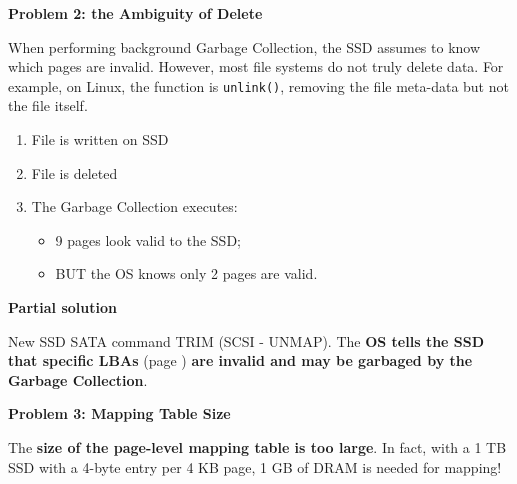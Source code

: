 \highspace
\begin{flushleft}
    \textcolor{Red2}{ \textbf{Problem 2: the Ambiguity of Delete}}
\end{flushleft}
When performing background Garbage Collection, the SSD assumes to know which pages are invalid. However, most file systems do not truly delete data. For example, on Linux, the  function is \texttt{unlink()}, removing the file meta-data but not the file itself.
\begin{enumerate}
    \item File is written on SSD
    \item File is deleted
    \item The Garbage Collection executes:
    \begin{itemize}
        \item 9 pages look valid to the SSD;
        \item BUT the OS knows only 2 pages are valid.
    \end{itemize}
\end{enumerate}

\highspace
\begin{flushleft}
    \textcolor{Green3}{ \textbf{Partial solution}}
\end{flushleft}
New SSD SATA command TRIM (SCSI - UNMAP). The \textbf{OS tells the SSD that specific LBAs} (page \pageref{LBA (Logical Block Address)}) \textbf{are invalid and may be garbaged by the Garbage Collection}.

\highspace
\begin{flushleft}
    \textcolor{Red2}{ \textbf{Problem 3: Mapping Table Size}}
\end{flushleft}
The \textbf{size of the page-level mapping table is too large}. In fact, with a 1 TB SSD with a 4-byte entry per 4 KB page, 1 GB of DRAM is needed for mapping!

